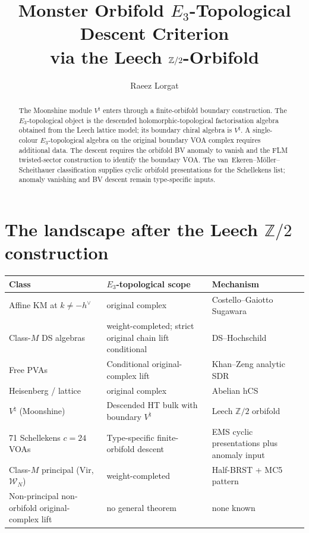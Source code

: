 \documentclass[11pt]{amsart}
\title{Monster Orbifold $E_3$-Topological Descent Criterion\\
via the Leech $\Z/2$-Orbifold}
\author{Raeez Lorgat}
\theoremstyle{definition}
\theoremstyle{remark}
\providecommand{\Z}{\mathbb{Z}}
\begin{document}
\maketitle

\begin{abstract}
The Moonshine module $V^\natural$ enters through a finite-orbifold
boundary construction.  The $E_3$-topological object is the descended
holomorphic-topological factorisation algebra obtained from the Leech
lattice model; its boundary chiral algebra is $V^\natural$.  A
single-colour $E_3$-topological algebra on the original boundary VOA
complex requires additional data.  The descent requires the orbifold BV
anomaly to vanish and the FLM twisted-sector construction to identify
the boundary VOA.  The
van~Ekeren--M\"oller--Scheithauer classification supplies cyclic
orbifold presentations for the Schellekens list; anomaly vanishing and
BV descent remain type-specific inputs.
\end{abstract}

\section{The landscape after the Leech $\Z/2$ construction}

\begin{center}
\renewcommand{\arraystretch}{1.3}
\begin{tabular}{lll}
\textbf{Class} & \textbf{$E_3$-topological scope} & \textbf{Mechanism} \\
\hline
Affine KM at $k \neq -h^\vee$ & original complex & Costello--Gaiotto
Sugawara \\
Class-$M$ DS algebras & weight-completed; strict original chain lift
conditional & DS--Hochschild \\
Free PVAs & Conditional original-complex lift & Khan--Zeng analytic SDR \\
Heisenberg / lattice & original complex & Abelian hCS \\
$V^\natural$ (Moonshine) & Descended HT bulk with boundary
$V^\natural$ & Leech $\Z/2$ orbifold \\
71 Schellekens $c=24$ VOAs & Type-specific finite-orbifold descent &
EMS cyclic presentations plus anomaly input \\
Class-$M$ principal (Vir, $\mathcal{W}_N$) & weight-completed &
Half-BRST + MC5 pattern \\
Non-principal non-orbifold original-complex lift & no general theorem & none known
\end{tabular}
\end{center}
\end{document}
